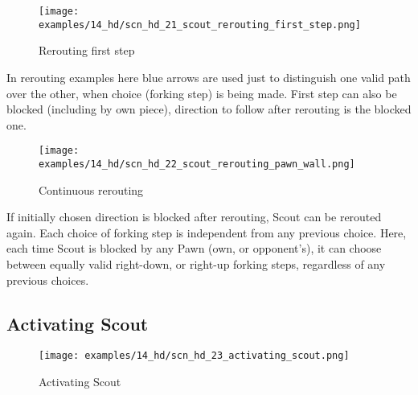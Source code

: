 \vspace*{-0.7\baselineskip}
\noindent
\begin{wrapfigure}[9]{l}{0.41\textwidth}
\centering
\texttt{[image: examples/14\_hd/scn\_hd\_21\_scout\_rerouting\_first\_step.png]}
\vspace*{-0.3\baselineskip}
\caption{Rerouting first step}
\label{fig:scn_hd_21_scout_rerouting_first_step}
\end{wrapfigure}
\indent
In rerouting examples here blue arrows are used just to distinguish one valid path over
the other, when choice (forking step) is being made. \newline
\indent
First step can also be blocked (including by own piece), direction to follow after
rerouting is the blocked one.

\vspace*{-0.7\baselineskip}
\noindent
\begin{wrapfigure}[11]{l}{0.41\textwidth} %
\centering
\texttt{[image: examples/14\_hd/scn\_hd\_22\_scout\_rerouting\_pawn\_wall.png]}
\vspace*{-0.3\baselineskip}
\caption{Continuous rerouting}
\label{fig:scn_hd_22_scout_rerouting_pawn_wall}
\end{wrapfigure}
\indent
If initially chosen direction is blocked after rerouting, Scout can be rerouted
again. Each choice of forking step is independent from any previous choice. \newline
\indent
Here, each time Scout is blocked by any Pawn (own, or opponent's), it can choose
between equally valid right-down, or right-up forking steps, regardless of any
previous choices.

\clearpage %

\subsection*{Activating Scout}
\label{sec:Hemera's Dawn/Scout/Activating Scout}

\vspace*{-1.3\baselineskip}
\noindent
\begin{figure}[!h]
\texttt{[image: examples/14\_hd/scn\_hd\_23\_activating\_scout.png]}
\vspace*{-1.3\baselineskip}
\caption{Activating Scout}
\label{fig:scn_hd_23_activating_scout}
\end{figure}

